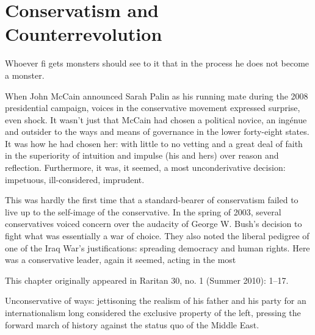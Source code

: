\chapter{Conservatism and Counterrevolution}\label{Conservatism and Counterrevolution}
 \par 
Whoever ﬁ gets monsters should see to it that in the process he does not become a monster.
 \par 
When John McCain announced Sarah Palin as his running mate during the 2008 presidential campaign, voices in the conservative movement expressed surprise, even shock. It wasn’t just that McCain had chosen a political novice, an ingénue and outsider to the ways and means of governance in the lower forty-eight states. It was how he had chosen her: with little to no vetting and a great deal of faith in the superiority of intuition and impulse (his and hers) over reason and reflection. Furthermore, it was, it seemed, a most unconderivative decision: impetuous, ill-considered, imprudent.
 \par 
This was hardly the first time that a standard-bearer of conservatism failed to live up to the self-image of the conservative. In the spring of 2003, several conservatives voiced concern over the audacity of George W. Bush’s decision to fight what was essentially a war of choice. They also noted the liberal pedigree of one of the Iraq War’s justifications: spreading democracy and human rights. Here was a conservative leader, again it seemed, acting in the most
 \par 
This chapter originally appeared in Raritan 30, no. {\color{blue}1} (Summer 2010): 1–17.
 \par 
Unconservative of ways: jettisoning the realism of his father and his party for an internationalism long considered the exclusive property of the left, pressing the forward march of history against the status quo of the Middle East.
 \par 
